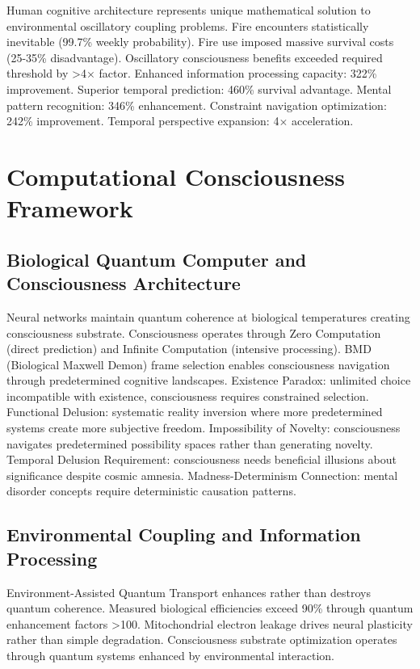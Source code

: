 \documentclass[12pt,a4paper]{article}
\begin{document}
Human cognitive architecture represents unique mathematical solution to environmental oscillatory coupling problems. Fire encounters statistically inevitable (99.7\% weekly probability). Fire use imposed massive survival costs (25-35\% disadvantage). Oscillatory consciousness benefits exceeded required threshold by >4$\times$ factor. Enhanced information processing capacity: 322\% improvement. Superior temporal prediction: 460\% survival advantage. Mental pattern recognition: 346\% enhancement. Constraint navigation optimization: 242\% improvement. Temporal perspective expansion: 4$\times$ acceleration.

\section{Computational Consciousness Framework}

\subsection{Biological Quantum Computer and Consciousness Architecture}

Neural networks maintain quantum coherence at biological temperatures creating consciousness substrate. Consciousness operates through Zero Computation (direct prediction) and Infinite Computation (intensive processing). BMD (Biological Maxwell Demon) frame selection enables consciousness navigation through predetermined cognitive landscapes. Existence Paradox: unlimited choice incompatible with existence, consciousness requires constrained selection. Functional Delusion: systematic reality inversion where more predetermined systems create more subjective freedom. Impossibility of Novelty: consciousness navigates predetermined possibility spaces rather than generating novelty. Temporal Delusion Requirement: consciousness needs beneficial illusions about significance despite cosmic amnesia. Madness-Determinism Connection: mental disorder concepts require deterministic causation patterns.

\subsection{Environmental Coupling and Information Processing}

Environment-Assisted Quantum Transport enhances rather than destroys quantum coherence. Measured biological efficiencies exceed 90\% through quantum enhancement factors >100. Mitochondrial electron leakage drives neural plasticity rather than simple degradation. Consciousness substrate optimization operates through quantum systems enhanced by environmental interaction.
\end{document}
